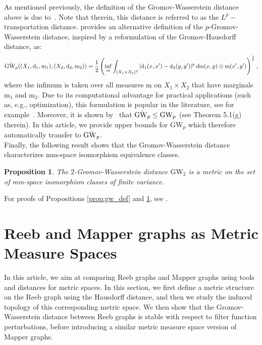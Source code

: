 \documentclass[pdflatex,sn-mathphys-ay]{sn-jnl}%
\newtheorem{proposition}{Proposition}[section]
\newcommand{\spa}{X}
\newcommand{\mes}{\mathrm{m}}
\newcommand{\dis}{\mathrm{d}}
\newcommand{\gromov}{\mathrm{GW}}
\newcommand{\change}[1]{\noindent #1}
\theoremstyle{thmstyleone}%
\begin{document}
\change{As mentioned previously, the definition of the Gromov-Wasserstein distance above is due to~\citet{sturm2006geometry}. Note that therein, this distance is referred to as the $L^p-$transportation distance. \citet{memoli2007use}} provides an alternative definition of the $p$-Gromov-Wasserstein distance, inspired by a reformulation of the Gromov-Hausdorff distance, as:
$$\Hat{\gromov_p}((\spa_1,\dis_1,\mes_1),(\spa_2,\dis_2,\mes_2))=\frac 12 \left(\inf_{\mes}\int_{(\spa_1\times \spa_2)^2} |\dis_1(x,x')-\dis_2(y,y')|^p\,d\mes(x,y)\otimes\mes(x',y')\right)^{\frac{1}{p}},$$
where the infimum is taken over all measures $\mes$ on $\spa_1\times \spa_2$ that have marginals $\mes_1$ and $\mes_2$. Due to its computational advantage for practical applications (such as, e.g., optimization), this formulation is popular in the literature, see for example~\citet{zhang2024gromov,memoli2009spectral}.
Moreover, it is shown by~\citet{memoli2011gromov}  that $\Hat{\gromov_p}\leq\gromov_p$ (see Theorem 5.1(g) therein). In this article, we provide upper bounds for $\gromov_p$ which therefore automatically transfer to $\Hat{\gromov_p}$.\\
\change{Finally, the following result shows that the Gromov-Wasserstein distance characterizes mm-space isomorphism equivalence classes. %
}

\begin{proposition}\label{prop:gw_met}
The $2$-Gromov-Wasserstein distance $\gromov_2$ is a metric on the set of mm-space isomorphism classes of finite variance.    
\end{proposition}

For proofs of Propositions \ref{prop:gw_def} and \ref{prop:gw_met}, see \citet{sturm2006geometry}.
\section{Reeb and Mapper graphs as Metric Measure Spaces}\label{sec:reeb_mms}

In this article, we aim at comparing Reeb graphs and Mapper graphs using tools and distances for metric spaces. In this section, we first define a metric structure on the Reeb graph using the Hausdorff distance, and then we study the induced topology of this corresponding metric space. \change{We then show that the Gromov-Wasserstein distance between Reeb graphs is stable with respect to filter function perturbations, before introducing a similar metric measure space version of Mapper graphs.}
\end{document}
